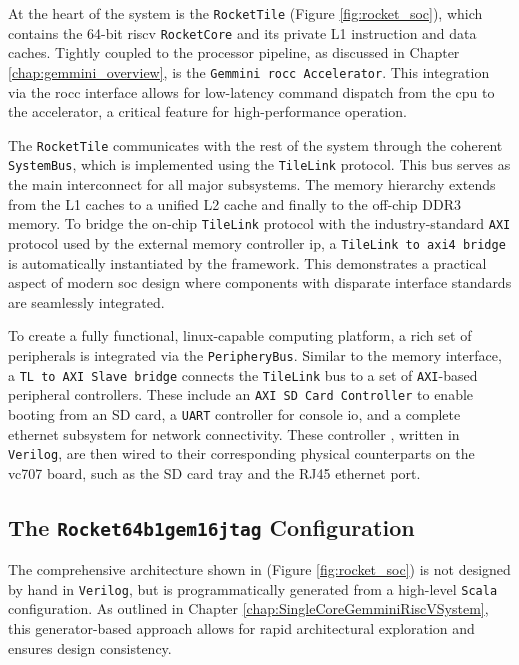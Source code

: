 At the heart of the system is the \texttt{RocketTile} (Figure \ref{fig:rocket_soc}), which contains the 64-bit \acrshort{riscv} \texttt{RocketCore} and its private L1 instruction and data caches. Tightly coupled to the processor pipeline, as discussed in Chapter \ref{chap:gemmini_overview}, is the \texttt{Gemmini \acrshort{rocc} Accelerator}. This integration via the \acrshort{rocc} interface allows for low-latency command dispatch from the \acrshort{cpu} to the accelerator, a critical feature for high-performance operation.

The \texttt{RocketTile} communicates with the rest of the system through the coherent \texttt{SystemBus}, which is implemented using the \texttt{TileLink} protocol. This bus serves as the main interconnect for all major subsystems. The memory hierarchy extends from the L1 caches to a unified L2 cache and finally to the off-chip DDR3 memory. To bridge the on-chip \texttt{TileLink} protocol with the industry-standard \texttt{AXI} protocol used by the external memory controller \acrshort{ip}, a \texttt{TileLink to \acrshort{axi4} bridge} is automatically instantiated by the framework. This demonstrates a practical aspect of modern \acrshort{soc} design where components with disparate interface standards are seamlessly integrated.

To create a fully functional, \acrshort{linux}-capable computing platform, a rich set of peripherals is integrated via the \texttt{PeripheryBus}. Similar to the memory interface, a \texttt{TL to AXI Slave bridge} connects the \texttt{TileLink} bus to a set of \texttt{AXI}-based peripheral controllers. These include an \texttt{AXI SD Card Controller} to enable booting from an SD card, a \texttt{UART} controller for console \acrshort{io}, and a complete \acrshort{ethernet} subsystem for network connectivity. These controller , written in \texttt{Verilog}, are then wired to their corresponding physical counterparts on the \acrshort{vc707} board, such as the SD card tray and the RJ45 \acrshort{ethernet} port.

\subsection{The \texttt{Rocket64b1gem16jtag} Configuration}
\label{sec:rocket64b1gem16jtag_config}

The comprehensive architecture shown in (Figure \ref{fig:rocket_soc}) is not designed by hand in \texttt{Verilog}, but is programmatically generated from a high-level \texttt{Scala} configuration. As outlined in Chapter \ref{chap:SingleCoreGemminiRiscVSystem}, this generator-based approach allows for rapid architectural exploration and ensures design consistency.

